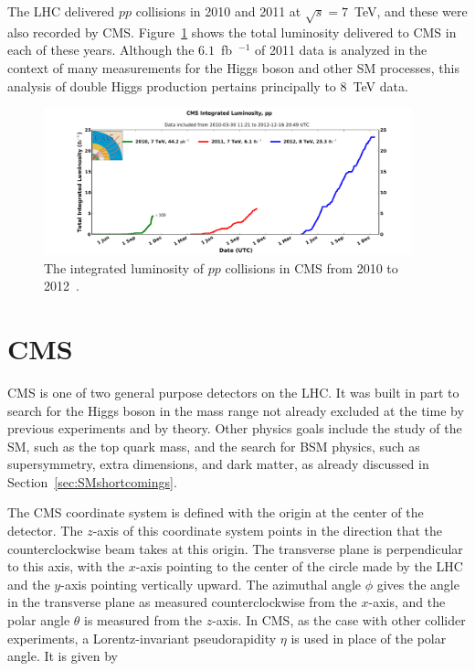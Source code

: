 The LHC delivered $pp$ collisions in 2010 and 2011 at $\sqrt{s} = 7$~TeV,
and these were also recorded by CMS.
Figure~\ref{fig:intlumi101112} shows the total luminosity delivered to CMS in each of these years.
Although the $6.1$~fb~$^{-1}$ of 2011 data is analyzed in the context of
many measurements for the Higgs boson and
other SM processes, this analysis of double Higgs production pertains principally to 8~TeV data.

\begin{figure}[ht]
 \begin{center}
    \includegraphics[width=0.95\textwidth]{figures/experiment/int_lumi_cumulative_pp_1.pdf}
      \end{center}
\caption{The integrated luminosity of $pp$ collisions in CMS from 2010 to 2012~\cite{CMS:lumi}.}
\label{fig:intlumi101112}
\end{figure}


\section{CMS\label{sec:CMS}}

CMS is one of two general purpose detectors on the LHC. It was built in part
to search for the Higgs boson in the mass range not already excluded
at the time by previous experiments
and by theory. Other physics goals include
the study of the SM, such as the top quark mass, and the search for BSM physics, such
as supersymmetry, extra dimensions, and dark matter, as already discussed in
Section~\ref{sec:SMshortcomings}.

The CMS coordinate system is defined with the origin at the center of the detector. The $z$-axis
of this coordinate system points in the direction that the counterclockwise beam takes at this origin.
The transverse plane is perpendicular to this axis, with the $x$-axis pointing to the center of the
circle made by the LHC and the $y$-axis pointing vertically upward. The azimuthal angle $\phi$ gives
the angle in the transverse plane as measured counterclockwise from the $x$-axis, and the polar angle
$\theta$ is measured from the $z$-axis. In CMS, as the case with other collider experiments,
a Lorentz-invariant pseudorapidity $\eta$ is used in place of the polar angle. It is given by

